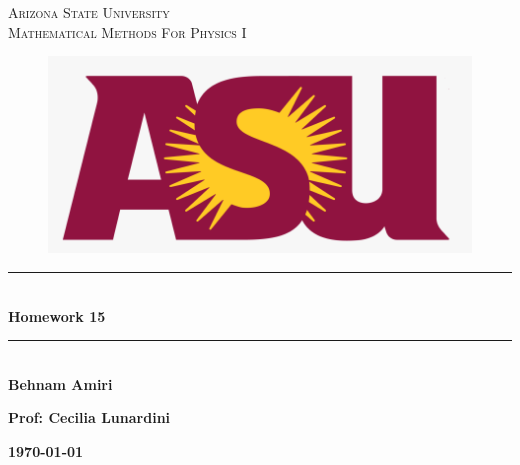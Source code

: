 \documentclass[fleqn]{article}
\begin{document}
  \begin{titlepage}

    \newcommand{\HRule}{\rule{\linewidth}{0.5mm}} %

    \center %


    \textsc{\LARGE Arizona State University}\\[1.5cm] %

    \textsc{\LARGE Mathematical Methods For Physics I }\\[1.5cm] %


    \begin{figure}
      \includegraphics[width=\linewidth]{asu.png}
    \end{figure}


    \HRule \\[0.4cm]
    { \huge \bfseries Homework 15}\\[0.4cm] 
    \HRule \\[1.5cm]

    \textbf{Behnam Amiri}

    \bigbreak

    \textbf{Prof: Cecilia Lunardini}

    \bigbreak


    \textbf{{\large \today}\\[2cm]}

    \vfill %

  \end{titlepage}
\end{document}
